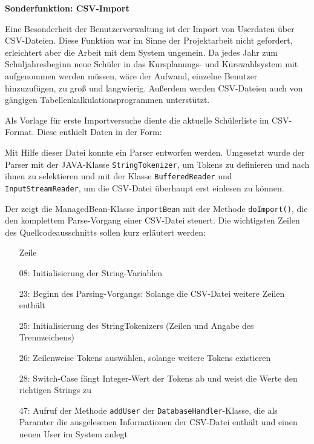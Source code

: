 \textbf{Sonderfunktion: CSV-Import}
\label{subsec:csvimport}

Eine Besonderheit der Benutzerverwaltung ist der Import von Userdaten über \ac{CSV}-Dateien. Diese Funktion war im Sinne der Projektarbeit nicht gefordert, erleichtert aber die Arbeit mit dem System ungemein. Da jedes Jahr zum Schuljahresbeginn neue Schüler in das Kursplanungs- und Kurswahlsystem mit aufgenommen werden müssen, wäre der Aufwand, einzelne Benutzer hinzuzufügen, zu groß und langwierig. Außerdem werden CSV-Dateien auch von gängigen Tabellenkalkulationsprogrammen unterstützt.

Als Vorlage für erste Importversuche diente die aktuelle Schülerliste im CSV-Format. Diese enthielt Daten in der Form:
	

Mit Hilfe dieser Datei konnte ein Parser entworfen werden. Umgesetzt wurde der Parser mit der JAVA-Klasse \texttt{StringTokenizer}, um Tokens zu definieren und nach ihnen zu selektieren und mit der Klasse \texttt{BufferedReader} und \texttt{InputStreamReader}, um die CSV-Datei überhaupt erst einlesen zu können. 

Der  zeigt die ManagedBean-Klasse \texttt{importBean} mit der Methode \texttt{doImport()}, die den komplettem Parse-Vorgang einer CSV-Datei steuert.
Die wichtigsten Zeilen des Quellcodeausschnitts sollen kurz erläutert werden:
\begin{itemize}
  \item[Zeile]
  \item[08:] Initialisierung der String-Variablen
  \item[23:] Beginn des Parsing-Vorgangs: Solange die CSV-Datei weitere Zeilen enthält
  \item[25:] Initialisierung des StringTokenizers (Zeilen und Angabe des Trennzeichens)
  \item[26:] Zeilenweise Tokens auswählen, solange weitere Tokens existieren
  \item[28:] Switch-Case fängt Integer-Wert der Tokens ab und weist die Werte den richtigen Strings zu
  \item[47:] Aufruf der Methode \texttt{addUser} der \texttt{DatabaseHandler}-Klasse, die als Paramter die ausgelesenen Informationen der CSV-Datei enthält und einen neuen User im System anlegt
\end{itemize}

